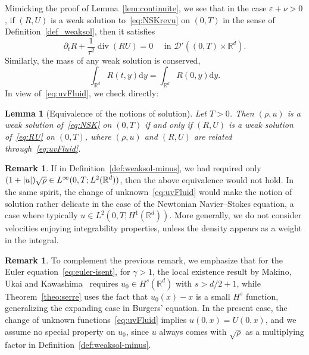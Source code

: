 \documentclass[11pt]{article}
\newtheorem{lemm}[theo]{Lemma}
\theoremstyle{definition}
\newtheorem{rema}[theo]{Remark}
\numberwithin{equation}{section}
\numberwithin{figure}{section}
\numberwithin{table}{section}
\DeclareMathOperator{\DIV}{div}
\newcommand*\R{\mathbb{R}}
\newcommand*\dd {\mathrm{d}}
\newcommand*\<{\left\langle}
\renewcommand*\>{\right\rangle}
\newcommand*\eps{\varepsilon}
\begin{document}
Mimicking the proof of Lemma~\ref{lem:continuite}, we see that in the case $\eps + \nu >0$, if $(R,U)$ is a weak solution to~\eqref{eq:NSKrevu} on $(0,T)$ in the sense of Definition~\ref{def_weaksol}, then it satisfies
\[
\partial_t R +\frac{1}{\tau^2} \DIV(R U) = 0 \quad \text{ in \ $\mathcal D'((0,T) \times \mathbb R^d).$}
\]
Similarly, the mass of any weak solution is conserved,
\begin{equation*}
\int_{\R^d} R(t,y)\dd y = \int_{\R^d} R(0,y)\dd y.
\end{equation*}
In view of~\eqref{eq:uvFluid}, we check directly:

\begin{lemm}[Equivalence of the notions of solution]\label{lem:equivalence}
Let $T>0$. Then $(\rho,u)$ is a weak solution of~\eqref{eq:NSK} on $(0,T)$ if and only if $(R,U)$ is a weak solution of~\eqref{eq:RU} on $(0,T)$, where $(\rho,u)$ and $(R,U)$ are related through~\eqref{eq:uvFluid}.
\end{lemm}

\begin{rema}
If in Definition~\ref{def:weaksol-minus}, we had required only $(1+|u|)\sqrt\rho\in\linebreak L^\infty(0,T; L^2(\R^d))$, then the above equivalence would not hold. In the same spirit, the change of unknown~\eqref{eq:uvFluid} would make the notion of solution rather delicate in the case of the Newtonian Navier--Stokes equation, a case where typically $u\in L^2(0,T; H^1(\R^d))$. More generally, we do not consider velocities enjoying integrability properties, unless the density appears as a weight in the integral.
\end{rema}

\begin{rema}
To complement the previous remark, we emphasize that for the Euler equation~\eqref{eq:euler-isent}, for $\gamma>1$, the local existence result by Makino, Ukai and Kawashima~\cite{MUK86} requires $u_0\in H^s(\R^d)$ with $s>d/2+1$, while Theorem~\ref{theo:serre} uses the fact that $u_0(x)-x$ is a small $H^s$ function, generalizing the expanding case in Burgers' equation. In the present case, the change of unknown functions~\eqref{eq:uvFluid} implies $u(0,x)=U(0,x)$, and we assume no special property on $u_0$, since $u$ always comes with $\sqrt{\rho}$ as a multiplying factor in Definition~\ref{def:weaksol-minus}.
\end{rema}
\end{document}
